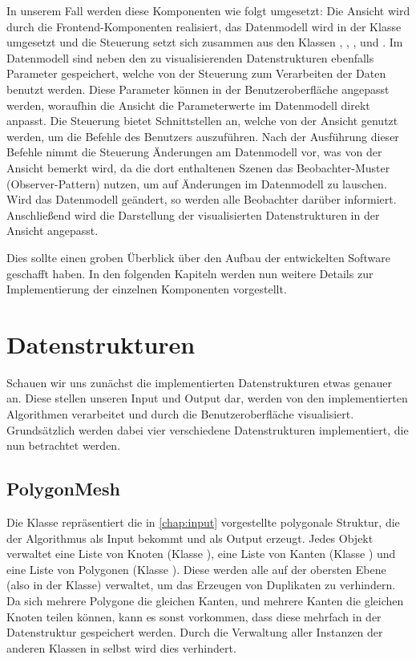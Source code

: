 In unserem Fall werden diese Komponenten wie folgt umgesetzt: Die Ansicht wird durch die Frontend-Komponenten realisiert, das Datenmodell wird in der
Klasse  umgesetzt und die Steuerung setzt sich zusammen aus den Klassen , ,
, und . Im Datenmodell sind neben den zu visualisierenden Datenstrukturen ebenfalls Parameter gespeichert,
welche von der Steuerung zum Verarbeiten der Daten benutzt werden. Diese Parameter können in der Benutzeroberfläche angepasst werden, woraufhin die
Ansicht die Parameterwerte im Datenmodell direkt anpasst. Die Steuerung bietet Schnittstellen an, welche von der Ansicht genutzt werden, um
die Befehle des Benutzers auszuführen. Nach der Ausführung dieser Befehle nimmt die Steuerung Änderungen am Datenmodell vor, was von der Ansicht bemerkt
wird, da die dort enthaltenen Szenen das Beobachter-Muster (Observer-Pattern) nutzen, um auf Änderungen im Datenmodell zu lauschen. Wird das Datenmodell
geändert, so werden alle Beobachter darüber informiert. Anschließend wird die Darstellung der visualisierten Datenstrukturen in der Ansicht angepasst.

Dies sollte einen groben Überblick über den Aufbau der entwickelten Software geschafft haben. In den folgenden Kapiteln werden nun weitere Details
zur Implementierung der einzelnen Komponenten vorgestellt.

\section{Datenstrukturen}
Schauen wir uns zunächst die implementierten Datenstrukturen etwas genauer an. Diese stellen unseren Input und Output dar, werden von den implementierten
Algorithmen verarbeitet und durch die Benutzeroberfläche visualisiert. Grundsätzlich werden dabei vier verschiedene Datenstrukturen implementiert, die nun
betrachtet werden.

\subsection{PolygonMesh}
Die  Klasse repräsentiert die in \autoref{chap:input} vorgestellte polygonale Struktur, die der Algorithmus
als Input bekommt und als Output erzeugt. Jedes  Objekt verwaltet eine Liste von Knoten (Klasse ),
eine Liste von Kanten (Klasse ) und eine Liste von Polygonen (Klasse ). Diese werden alle auf der
obersten Ebene (also in der  Klasse) verwaltet, um das Erzeugen von Duplikaten zu verhindern. Da sich
mehrere Polygone die gleichen Kanten, und mehrere Kanten die gleichen Knoten teilen können, kann es sonst vorkommen, dass diese mehrfach
in der Datenstruktur gespeichert werden. Durch die Verwaltung aller Instanzen der anderen Klassen in  selbst wird
dies verhindert.

